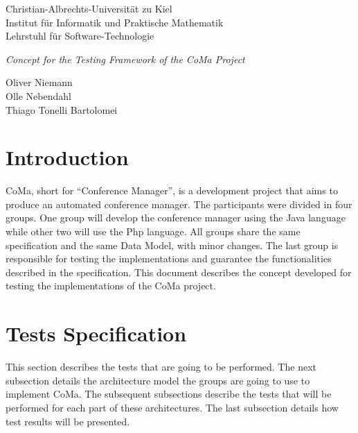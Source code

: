 \documentclass[11pt]{article}
\begin{document}
\begin{center}

{\large
{\sc Christian-Albrechts-Universit\"{a}t zu Kiel} \\
Institut f\"{u}r Informatik und Praktische Mathematik \\
Lehrstuhl f\"{u}r Software-Technologie }

\bigskip

{\Large\it Concept for the Testing Framework of the CoMa Project}

\bigskip

{\small Oliver Niemann} \\
{\small Olle Nebendahl} \\
{\small Thiago Tonelli Bartolomei}

\end{center}

\section{Introduction}

\indent

CoMa, short for ``Conference Manager'', is a development project that aims to produce an automated conference manager. The participants were divided in four groups. One group will develop the conference manager using the Java language while other two will use the Php language. All groups share the same specification and the same Data Model, with minor changes. The last group is responsible for testing the implementations and guarantee the functionalities described in the specification. This document describes the concept developed for testing the implementations of the CoMa project.

\section{Tests Specification}

\indent

This section describes the tests that are going to be performed. The next subsection details the architecture model the groups are going to use to implement CoMa. The subsequent subsections describe the tests that will be performed for each part of these architectures. The last subsection details how test results will be presented.
\end{document}
